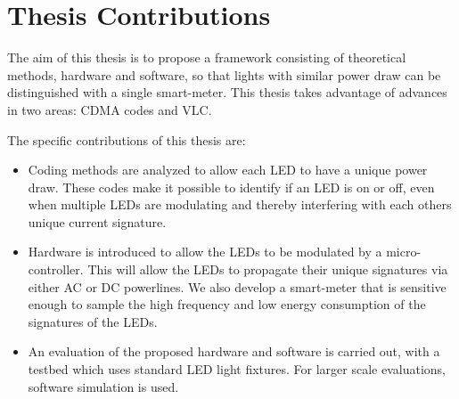 

\section{Thesis Contributions}

The aim of this thesis is to propose a framework consisting of theoretical methods, hardware and software, so that lights with similar power draw can be distinguished with a single smart-meter.
This thesis takes advantage of advances in two areas: CDMA codes and VLC.

The specific contributions of this thesis are:

\begin{itemize}

	\item Coding methods are analyzed to allow each LED to have a unique power draw. 
	These codes make it possible to identify if an LED is on or off, even when multiple LEDs are modulating and thereby interfering with each others unique current signature.




	\item Hardware is introduced to allow the LEDs to be modulated by a micro-controller. 
	This will allow the LEDs to propagate their unique signatures via either AC or DC powerlines.
	We also develop a smart-meter that is sensitive enough to sample the high frequency and low energy consumption of the signatures of the LEDs. 




	\item An evaluation of the proposed hardware and software is carried out, with a testbed which uses standard LED light fixtures. For larger scale evaluations, software simulation is used. 
\end{itemize}
